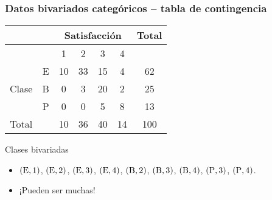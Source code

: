 \documentclass[table]{beamer}
\begin{document}
\begin{frame}
    \frametitle{Datos bivariados categóricos -- tabla de contingencia}
    \begin{center}
        \begin{tabular}{c|c|cccc|c}
            & & \multicolumn{4}{c|}{Satisfacción} & Total \\
            \hline
            & & 1 & 2 & 3 & 4 & \\
            \hline
            & E & 10 & 33 & 15 & 4 & 62 \\
            Clase & B & 0 & 3 & 20 & 2 & 25 \\
            & P & 0 & 0 & 5 & 8 & 13 \\
            \hline
            Total & & 10 & 36 & 40 & 14 & 100
        \end{tabular}
    \end{center}
    \begin{block}{Clases bivariadas}
        \begin{itemize}
            \item $\parens{\text{E} , 1}$, $\parens{\text{E} , 2}$, $\parens{\text{E} , 3}$, $\parens{\text{E} , 4}$, $\parens{\text{B} , 2}$, $\parens{\text{B} , 3}$, $\parens{\text{B} , 4}$, $\parens{\text{P}, 3}$, $\parens{\text{P} , 4}$.
            \item ¡Pueden ser muchas!
        \end{itemize}
    \end{block}
\end{frame}
\end{document}

